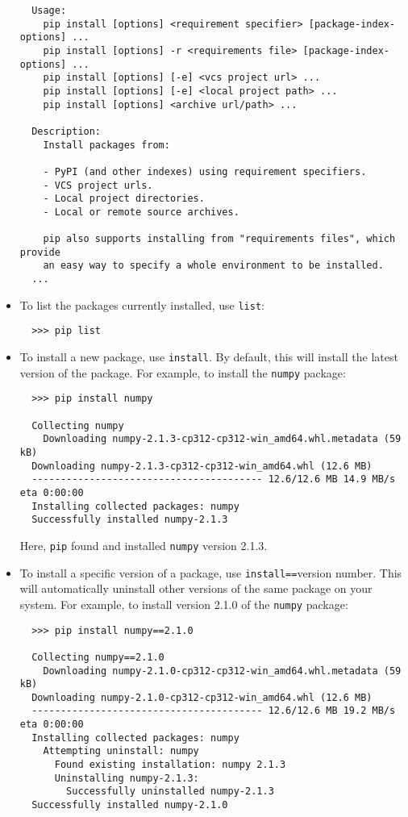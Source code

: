 \documentclass{UNB-Physics-Assignment}
\begin{document}
\begin{itemize}
\begin{verbatim}
  Usage:
    pip install [options] <requirement specifier> [package-index-options] ...
    pip install [options] -r <requirements file> [package-index-options] ...
    pip install [options] [-e] <vcs project url> ...
    pip install [options] [-e] <local project path> ...
    pip install [options] <archive url/path> ...

  Description:
    Install packages from:

    - PyPI (and other indexes) using requirement specifiers.
    - VCS project urls.
    - Local project directories.
    - Local or remote source archives.

    pip also supports installing from "requirements files", which provide
    an easy way to specify a whole environment to be installed.
  ...
\end{verbatim}

\item To list the packages currently installed, use \verb"list":
\begin{verbatim}
  >>> pip list
\end{verbatim}

\item To install a new package, use \verb"install". By default, this will install the latest version of the package. For example, to install the \verb"numpy" package:
\begin{verbatim}
  >>> pip install numpy

  Collecting numpy
    Downloading numpy-2.1.3-cp312-cp312-win_amd64.whl.metadata (59 kB)
  Downloading numpy-2.1.3-cp312-cp312-win_amd64.whl (12.6 MB)
  ---------------------------------------- 12.6/12.6 MB 14.9 MB/s eta 0:00:00
  Installing collected packages: numpy
  Successfully installed numpy-2.1.3
\end{verbatim}

Here, \verb"pip" found and installed \verb"numpy" version 2.1.3.

\item To install a specific version of a package, use \verb"install=="version number. This will automatically uninstall other versions of the same package on your system. For example, to install version 2.1.0 of the \verb"numpy" package:
\begin{verbatim}
  >>> pip install numpy==2.1.0

  Collecting numpy==2.1.0
    Downloading numpy-2.1.0-cp312-cp312-win_amd64.whl.metadata (59 kB)
  Downloading numpy-2.1.0-cp312-cp312-win_amd64.whl (12.6 MB)
  ---------------------------------------- 12.6/12.6 MB 19.2 MB/s eta 0:00:00
  Installing collected packages: numpy
    Attempting uninstall: numpy
      Found existing installation: numpy 2.1.3
      Uninstalling numpy-2.1.3:
        Successfully uninstalled numpy-2.1.3
  Successfully installed numpy-2.1.0
\end{verbatim}


\end{itemize}
\end{document}
